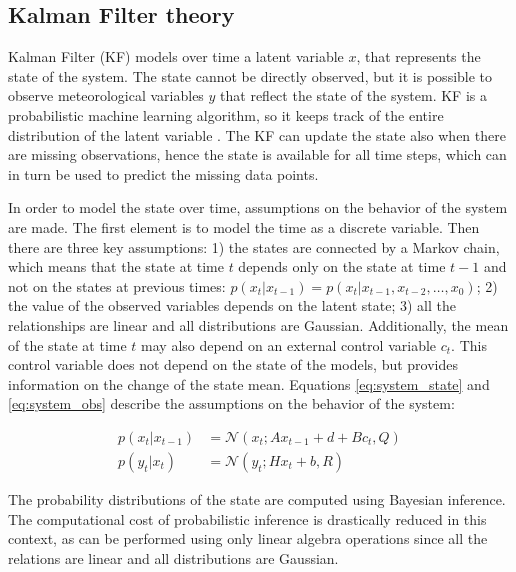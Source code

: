 \documentclass{article}
\newcommand{\norm}[3]{\mathcal{N}\left(#1; #2, #3\right)} %
\let\Oldsubsection\subsection
\renewcommand{\subsection}{\FloatBarrier\Oldsubsection}
\begin{document}
\subsection{Kalman Filter theory}

Kalman Filter (KF) models over time a latent variable $x$, that represents the state of the system. The state cannot be directly observed, but it is possible to observe meteorological variables $y$ that reflect the state of the system. 
KF is a probabilistic machine learning algorithm, so it keeps track of the entire distribution of the latent variable \cite{bishop_pattern_2006}.
The KF can update the state also when there are missing observations, hence the state is available for all time steps, which can in turn be used to predict the missing data points.

In order to model the state over time, assumptions on the behavior of the system are made. The first element is to model the time as a discrete variable.  Then there are three key assumptions: 1) the states are connected by a Markov chain, which means that the state at time $t$ depends only on the state at time $t-1$ and not on the states at previous times: $p(x_t|x_{t-1}) = p(x_t|x_{t-1}, x_{t-2}, \hdots, x_0)$; 2) the value of the observed variables depends on the latent state; 3) all the relationships are linear and all distributions are Gaussian. Additionally, the mean of the state at time $t$ may also depend on an external control variable $c_t$. This control variable does not depend on the state of the models, but provides information on the change of the state mean.
Equations \ref{eq:system_state} and \ref{eq:system_obs} describe the assumptions on the behavior of the system:

\begin{align}
p(x_t | x_{t-1}) &= \norm{x_t}{Ax_{t-1} + d + Bc_t}{Q} \label{eq:system_state}\\
p(y_t | x_t) &= \norm{y_t}{Hx_t + b}{R} \label{eq:system_obs}
\end{align}

The probability distributions of the state are computed using Bayesian inference. The computational cost of probabilistic inference is drastically reduced in this context, as can be performed using only linear algebra operations since all the relations are linear and all distributions are Gaussian.
\end{document}
